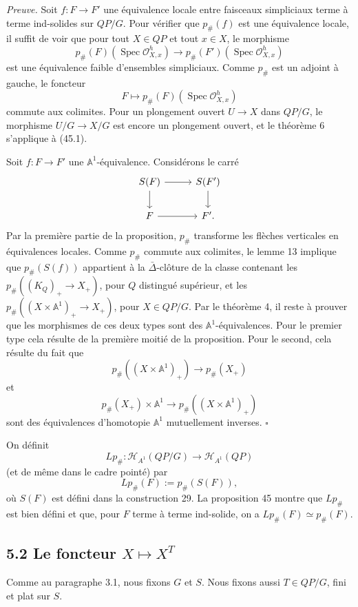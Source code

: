 \documentclass[11pt]{article}
\newcommand{\Aone}{\mathbb A^1}
\newcommand{\Spec}{\operatorname{Spec}}
\newcommand{\Ho}{\mathcal H}
\theoremstyle{deligne}
\newenvironment{proofdel}{\noindent\textit{Preuve.}}{\hfill$\square$}
\begin{document}
\begin{proofdel}
Soit \(f:F\to F'\) une équivalence locale entre faisceaux simpliciaux terme à terme ind-solides sur \(QP/G\). Pour vérifier que \(p_\#(f)\) est une équivalence locale, il suffit de voir que pour tout \(X\in QP\) et tout \(x\in X\), le morphisme
\[
p_\#(F)(\Spec\mathcal O^h_{X,x})\longrightarrow
p_\#(F')(\Spec\mathcal O^h_{X,x})
\]
est une équivalence faible d'ensembles simpliciaux. Comme \(p_\#\) est un adjoint à gauche, le foncteur
\[
F\longmapsto p_\#(F)(\Spec\mathcal O^h_{X,x})
\tag{45.1}
\]
commute aux colimites. Pour un plongement ouvert \(U\to X\) dans \(QP/G\), le morphisme \(U/G\to X/G\) est encore un plongement ouvert, et le théorème 6 s'applique à (45.1).

Soit \(f:F\to F'\) une \(\Aone\)-équivalence. Considérons le carré
\[
\begin{tikzcd}[column sep=2.8em,row sep=1.8em]
S(F) \arrow[r] \arrow[d] & S(F') \arrow[d]\\
F \arrow[r] & F' .
\end{tikzcd}
\]
Par la première partie de la proposition, \(p_\#\) transforme les flèches verticales en équivalences locales. Comme \(p_\#\) commute aux colimites, le lemme 13 implique que \(p_\#(S(f))\) appartient à la \(\bar\Delta\)-clôture de la classe contenant les \(p_\#((K_Q)_+\to X_+)\), pour \(Q\) distingué supérieur, et les \(p_\#((X\times\Aone)_+\to X_+)\), pour \(X\in QP/G\). Par le théorème 4, il reste à prouver que les morphismes de ces deux types sont des \(\Aone\)-équivalences. Pour le premier type cela résulte de la première moitié de la proposition. Pour le second, cela résulte du fait que
\[
p_\#((X\times\Aone)_+)\longrightarrow p_\#(X_+)
\]
et
\[
p_\#(X_+)\times\Aone\longrightarrow p_\#((X\times\Aone)_+)
\]
sont des équivalences d'homotopie \(\Aone\) mutuellement inverses.
\end{proofdel}

On définit
\[
Lp_\#:\Ho_{A^1}(QP/G)\longrightarrow \Ho_{A^1}(QP)
\]
(et de même dans le cadre pointé) par
\[
Lp_\#(F):=p_\#(S(F)),
\]
où \(S(F)\) est défini dans la construction 29. La proposition 45 montre que \(Lp_\#\) est bien défini et que, pour \(F\) terme à terme ind-solide, on a \(Lp_\#(F)\simeq p_\#(F)\).

\subsection*{5.2 Le foncteur \(X\mapsto X^T\)}

Comme au paragraphe 3.1, nous fixons \(G\) et \(S\). Nous fixons aussi \(T\in QP/G\), fini et plat sur \(S\).
\end{document}
